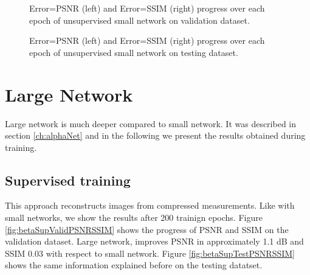 \begin{figure}[!htb] 
\centering 
{} 
\caption[PSNR and SSIM validation progress during training of unsupervised small network]{\color{red}Error=PSNR \color{black}(left) and \color{red}Error=SSIM \color{black}(right) progress over each epoch of unsupervised small network on validation dataset.}
\label{fig:alphaUnsupValidPSNRSSIM} 
\end{figure}

\vspace{1cm}

\begin{figure}[!htb] 
\centering 
{} 
\caption[PSNR and SSIM testing progress during training of unsupervised small network]{\color{red}Error=PSNR \color{black}(left) and \color{red}Error=SSIM \color{black}(right) progress over each epoch of unsupervised small network on testing dataset.}
\label{fig:alphaUnsupTestPSNRSSIM} 
\end{figure}


\FloatBarrier




\section{Large Network}
Large network is much deeper compared to small network. It was described in section \ref{ch:alphaNet} and in the following we present the results obtained during training.

\subsection{Supervised training}
This approach reconstructs images from compressed measurements. Like with small networks, we show the results after 200 trainign epochs. Figure \ref{fig:betaSupValidPSNRSSIM} shows the progress of PSNR and SSIM on the validation dataset. Large network, improves PSNR in approximately 1.1 dB and SSIM 0.03 with respect to small network. Figure \ref{fig:betaSupTestPSNRSSIM} shows the same information explained before on the testing datatset. 

